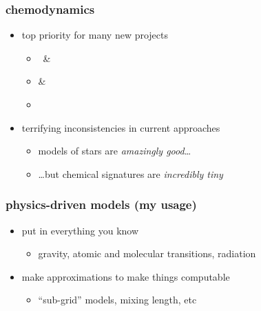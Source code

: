 \documentclass[pdftex]{beamer}
\begin{document}
\begin{frame}
  \frametitle{chemodynamics}
  \begin{itemize}
  \item top priority for many new projects
    \begin{itemize}
    \item \gaia\ \& 
    \item {} \& 
    \item \sdssiii\ \apogee
    \end{itemize}
  \item terrifying inconsistencies in current approaches
    \begin{itemize}
    \item models of stars are \emph{amazingly good}\ldots
    \item \ldots but chemical signatures are \emph{incredibly tiny}
    \end{itemize}
  \end{itemize}
\end{frame}

\begin{frame}
  \frametitle{physics-driven models (my usage)}
  \begin{itemize}
  \item put in everything you know
    \begin{itemize}
    \item gravity, atomic and molecular transitions, radiation
    \end{itemize}
  \item make approximations to make things computable
    \begin{itemize}
    \item ``sub-grid'' models, mixing length, etc
    \end{itemize}
  \end{itemize}
\end{frame}
\end{document}
